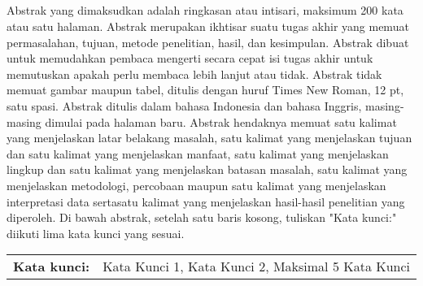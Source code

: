 
\begin{center}
\textbf{\fontsize{12pt}{0}\selectfont{Judul Skripsi Anda}} \\
\vspace{14pt}
\textbf{\fontsize{12pt}{0}\selectfont{Nama Mahasiswa (1xx45xxxx)}}\\
\textbf{\fontsize{12pt}{0}\selectfont{Nama Pembimbing 1 beserta gelar}}\\
\textbf{\fontsize{12pt}{0}\selectfont{Nama Pembimbing 2 beserta gelar}}\\
\vspace{36pt}
\textbf{\fontsize{12pt}{0}\selectfont{ABSTRAK INGGRIS WOI}}
\end{center}
\vspace{20pt}
\singlespacing
Abstrak yang dimaksudkan adalah ringkasan atau intisari, maksimum 200 kata atau satu halaman. Abstrak merupakan ikhtisar suatu tugas akhir yang memuat permasalahan, tujuan, metode penelitian, hasil, dan kesimpulan. Abstrak dibuat untuk memudahkan pembaca mengerti secara cepat isi tugas akhir untuk memutuskan apakah perlu membaca lebih lanjut atau tidak. Abstrak tidak memuat gambar maupun tabel, ditulis dengan huruf Times New Roman, 12 pt, satu spasi. Abstrak ditulis dalam bahasa Indonesia dan bahasa Inggris, masing-masing dimulai pada halaman baru. Abstrak hendaknya memuat satu kalimat yang menjelaskan latar belakang masalah, satu kalimat yang menjelaskan tujuan dan satu kalimat yang menjelaskan manfaat, satu kalimat yang menjelaskan lingkup dan satu kalimat yang menjelaskan batasan masalah, satu kalimat yang menjelaskan metodologi, percobaan maupun satu kalimat yang menjelaskan interpretasi data sertasatu kalimat yang menjelaskan hasil-hasil penelitian yang diperoleh. Di bawah abstrak, setelah satu baris kosong, tuliskan "Kata kunci:" diikuti lima kata kunci yang sesuai.


\singlespacing
\noindent 
\vspace{1ex}
\noindent
\begin{tabularx}{\textwidth}{@{}lX@{}}
    {\textbf{Kata kunci:}} & {Kata Kunci 1, Kata Kunci 2, Maksimal 5 Kata Kunci}
\end{tabularx}
